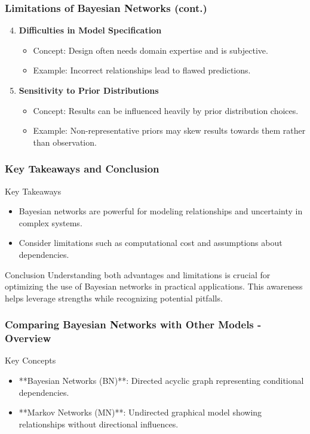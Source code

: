 \documentclass[aspectratio=169]{beamer}
\begin{document}
\begin{frame}[fragile]
    \frametitle{Limitations of Bayesian Networks (cont.)}
    \begin{enumerate}
        \setcounter{enumi}{3} %
        \item \textbf{Difficulties in Model Specification}
            \begin{itemize}
                \item Concept: Design often needs domain expertise and is subjective.
                \item Example: Incorrect relationships lead to flawed predictions.
            \end{itemize}
        \item \textbf{Sensitivity to Prior Distributions}
            \begin{itemize}
                \item Concept: Results can be influenced heavily by prior distribution choices.
                \item Example: Non-representative priors may skew results towards them rather than observation.
            \end{itemize}
    \end{enumerate}
\end{frame}

\begin{frame}[fragile]
    \frametitle{Key Takeaways and Conclusion}
    \begin{block}{Key Takeaways}
        \begin{itemize}
            \item Bayesian networks are powerful for modeling relationships and uncertainty in complex systems.
            \item Consider limitations such as computational cost and assumptions about dependencies.
        \end{itemize}
    \end{block}
    \begin{block}{Conclusion}
        Understanding both advantages and limitations is crucial for optimizing the use of Bayesian networks in practical applications. This awareness helps leverage strengths while recognizing potential pitfalls.
    \end{block}
\end{frame}

\begin{frame}[fragile]
    \frametitle{Comparing Bayesian Networks with Other Models - Overview}
    \begin{block}{Key Concepts}
        \begin{itemize}
            \item **Bayesian Networks (BN)**: Directed acyclic graph representing conditional dependencies.
            \item **Markov Networks (MN)**: Undirected graphical model showing relationships without directional influences.
        \end{itemize}
    \end{block}
\end{frame}
\end{document}
